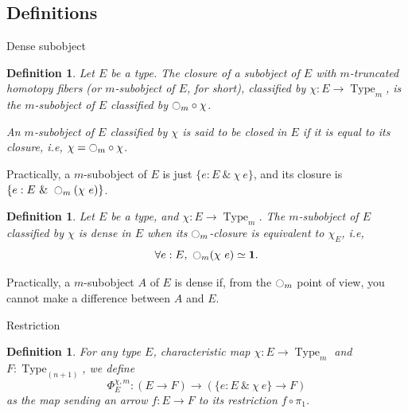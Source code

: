 \documentclass{beamer}
\newtheorem{defi}[thm]{Definition}
\newcommand{\ie}{i.e,\xspace}
\DeclareMathOperator{\Type}{Type}
\newcommand{\modal}{\ensuremath{\ocircle}}
\newcommand \one {\mathbf{1}}
\newcommand{\nType}[1]{\Type_{#1}}
\begin{document}
\subsection{Definitions}
\label{sec:definitions}

\begin{frame}[allowframebreaks]{Dense subobject}
  \note{ }
  \begin{defi}
    Let $E$ be a type. The {\em closure} of a subobject of $E$ with
    $m$-truncated homotopy fibers (or $m$-subobject of $E$, for short),
    classified by $\chi : E \to \nType m$, is the $m$-subobject of $E$
    classified by $\modal_m \circ \chi$.


    An $m$-subobject of $E$ classified by $\chi$ is said to be {\em
      closed in $E$} if it is equal to its closure, \ie
    $\chi = \modal_m \circ \chi$.
  \end{defi}

  Practically, a $m$-subobject of $E$ is just $\{e:E ~\&~ \chi~e\}$, and
  its closure is $\{e:E~\&~\modal_m(\chi~e)\}$.
  \framebreak
  \begin{defi}
    Let $E$ be a type, and $\chi:E \to \nType m$. The $m$-subobject of $E$
    classified by $\chi$ is {\em dense} in $E$ when its $\modal_m$-closure
    is equivalent to $\chi_E$, \ie
    $$\forall e:E,~ \modal_m  (\chi~e) \simeq \one.$$
  \end{defi}

  Practically, a $m$-subobject $A$ of $E$ is dense if, from the $\modal_m$ point of
  view, you cannot make a difference between $A$ and $E$.
  
\end{frame}

\begin{frame}{Restriction}
  \note{ }
  \begin{defi}
    For any type $E$, characteristic map $\chi : E \to \nType m$ and $F:\nType {(n+1)}$, we define
    $$
    \Phi_E^{\chi,m} : (E \to F) \to (\{e:E~\&~\chi~e\} \to F) 
    $$
    as the map sending an
    arrow $f:E\to F$ to its restriction $f \circ \pi_1$.
  \end{defi}
\end{frame}
\end{document}
